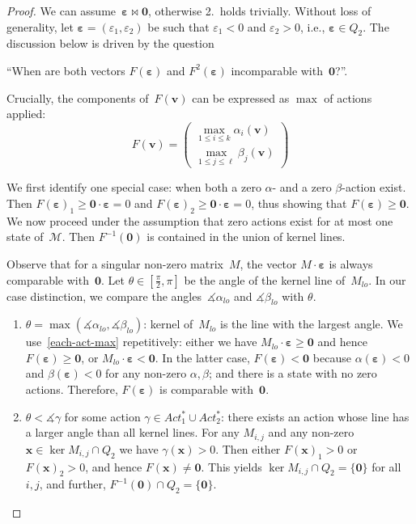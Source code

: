 \documentclass[preprint,12pt]{elsarticle}
\theoremstyle{plain}
\theoremstyle{definition}
\theoremstyle{remark}
\theoremstyle{claimstyle}
\newcommand{\mdp}{\mathcal{M}}
\newcommand{\eps}{\bm{\varepsilon}}
\begin{document}
\begin{proof}
	We can assume~$\eps\bowtie\bm{0}$, otherwise 2.\ holds trivially.
	Without loss of generality, let $\eps = (\varepsilon_1, \varepsilon_2)$ be such that $\varepsilon_1 < 0$ and $\varepsilon_2 > 0$, i.e., $\eps \in Q_2$.
	The discussion below is driven by the question 
	\begin{center}
		``When are both vectors $F(\eps)$ and $F^2(\eps)$ incomparable with~$\bm{0}$?''.
	\end{center}
	
	Crucially, the components of~$F(\bm{v})$ can be expressed as $\max$ of actions applied:
	\begin{equation}\label{each-act-max}
		F(\bm{v}) = 
		\begin{pmatrix} \max_{1\leq i \leq k}  \alpha_i(\bm{v}) \\ \max_{1\leq j \leq \ell}  \beta_j(\bm{v})
		\end{pmatrix}
	\end{equation}
	
	We first identify one special case: when both a zero $\alpha$- and a zero $\beta$-action exist.
	Then $F(\eps)_1 \geq \bm{0}\cdot\eps = 0$ and $F(\eps)_2 \geq \bm{0}\cdot\eps = 0$,
	thus showing that $F(\eps) \geq \bm{0}$.
	We now proceed under the assumption that zero actions exist for at most one state of~$\mdp$.
	Then $F^{-1}(\bm{0})$ is contained in the union of kernel lines.
	
		Observe that for a singular non-zero matrix~$M$, the vector $M\cdot\eps$ is always comparable with~$\bm{0}$.
		Let $\theta \in [\frac{\pi}{2}, \pi]$ be the angle of the kernel line of~$M_{lo}$.
		In our case distinction, we compare the angles~$\measuredangle \alpha_{lo}$ and $\measuredangle\beta_{lo}$ with $\theta$.
		\begin{enumerate}
			\item $\theta = \max(\measuredangle \alpha_{lo}, \measuredangle \beta_{lo})$: kernel of~$M_{lo}$ is the line with the largest angle. 
			We use~\cref{each-act-max} repetitively: either we have 
			$M_{lo}\cdot\eps \geq \bm{0}$ and hence $F(\eps) \geq \bm{0}$, or $M_{lo} \cdot\eps < \bm{0}$. 
			In the latter case, $F(\eps) < \bm{0}$ 
			because $\alpha(\eps) < 0$ and $\beta(\eps) < 0$ for any non-zero $\alpha,\beta$; 
			and there is a state with no zero actions.
			Therefore, $F(\eps)$ is comparable with~$\bm{0}$.
			\item $\theta < \measuredangle\gamma$ for some action $\gamma \in Act_1^* \cup Act_2^*$: there exists an action whose line has a larger angle than all kernel lines.
			For any $M_{i,j}$ and any non-zero $\bm{x} \in \ker M_{i,j} \cap Q_2$ we have $\gamma(\bm{x}) > 0$. 
			Then either $F(\bm{x})_1 > 0$ or $F(\bm{x})_2 > 0$, and hence $F(\bm{x}) \neq \bm{0}$. 
			This yields $\ker M_{i,j} \cap Q_2 = \{\bm{0}\}$ for all~$i,j$,
			and further, $F^{-1}(\bm{0}) \cap Q_2 = \{\bm{0}\}$. 
			

\end{enumerate}
\end{proof}
\end{document}

